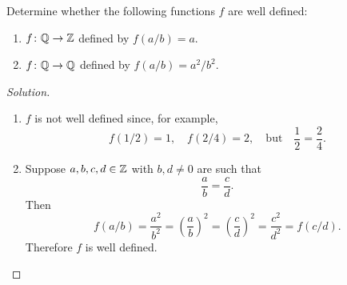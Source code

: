 Determine whether the following functions $f$ are well defined:
\begin{enumerate}
\item
  $f\colon\mathbb{Q}\to\mathbb{Z}$ defined by $f(a/b) = a$.

\item
  $f\colon\mathbb{Q}\to\mathbb{Q}$ defined by $f(a/b) = a^2/b^2$.
\end{enumerate}
\begin{proof}[Solution]
  \begin{enumerate}
  \item
    $f$ is not well defined since, for example,
    \begin{equation*}
      f(1/2) = 1, \quad f(2/4) = 2, \quad\text{but}\quad\frac12 = \frac24.
    \end{equation*}

  \item
    Suppose $a,b,c,d\in\mathbb{Z}$ with $b, d\neq 0$ are such that
    \begin{equation*}
      \frac{a}{b} = \frac{c}{d}.
    \end{equation*}
    Then
    \begin{equation*}
      f(a/b) = \frac{a^2}{b^2} = \left(\frac ab\right)^2
      = \left(\frac cd\right)^2 = \frac{c^2}{d^2} = f(c/d).
    \end{equation*}
    Therefore $f$ is well defined.
  \end{enumerate}
\end{proof}

